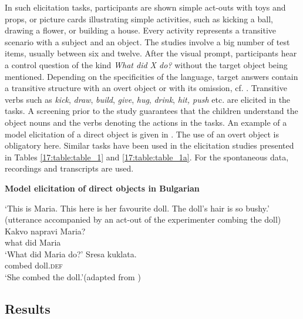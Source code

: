\documentclass[output=paper,modfonts,newtxmath,hidelinks,]{langscibook}
\begin{document}
\noindent In such elicitation tasks, participants are shown simple act-outs with toys and props, or picture cards illustrating simple activities, such as kicking a ball, drawing a flower, or building a house. Every activity represents a transitive scenario with a subject and an object. The studies involve a big number of test items, usually between six and twelve. After the visual prompt, participants hear a control question of the kind \textit{What did X do?} without the target object being mentioned. Depending on the specificities of the language, target answers contain a transitive structure with an overt object or with its omission, cf. . Transitive verbs such as \textit{kick}, \textit{draw}, \textit{build}, \textit{give}, \textit{hug}, \textit{drink}, \textit{hit, push} etc. are elicited in the tasks. A screening prior to the study guarantees that the children understand the object nouns and the verbs denoting the actions in the tasks. An example of a model elicitation of a direct object is given in . The use of an overt object is obligatory here. Similar tasks have been used in the elicitation studies presented in Tables \ref{17:table:table_1} and \ref{17:table:table_1a}. For the spontaneous data, recordings and transcripts are used.\largerpage[-2]

\ea \textbf{Model elicitation of direct objects in Bulgarian}\label{17:ex5}
\begin{exe}
\exi{}   `This is Maria. This here is her favourite doll. The doll’s hair is so bushy.' (utterance accompanied by an act-out of the experimenter combing the doll)
\exi{}	\gll Kakvo napravi Maria?\\
     	what did Maria\\
		\glt ‘What did Maria do?’
\exi{}	\gll Sresa kuklata.\\
        combed doll.\textsc{def}\\
		\glt ‘She combed the doll.’\hfill (adapted from \citealt[79]{Radeva-Bork2012})
\end{exe}        
\z

\subsection{Results}\label{17:sec:key:3.2}
\end{document}

